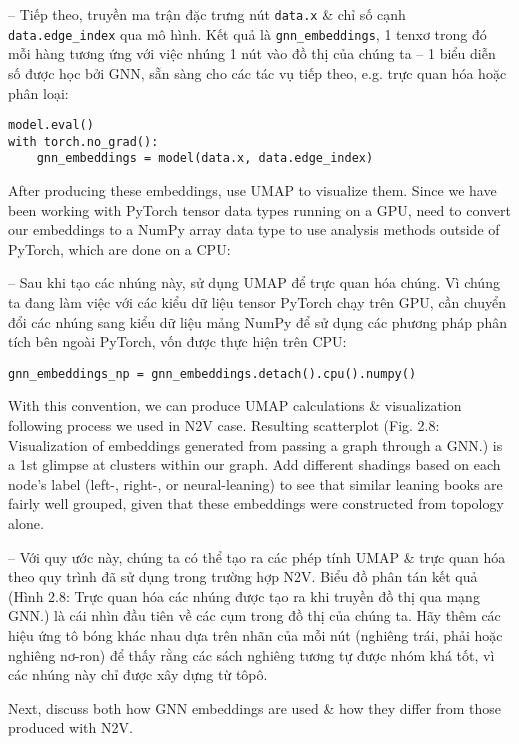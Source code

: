 \documentclass{article}
\begin{document}
\begin{itemize}
\begin{itemize}
\begin{itemize}
\begin{itemize}
               -- Tiếp theo, truyền ma trận đặc trưng nút {\tt data.x} \& chỉ số cạnh \verb|data.edge_index| qua mô hình. Kết quả là \verb|gnn_embeddings|, 1 tenxơ trong đó mỗi hàng tương ứng với việc nhúng 1 nút vào đồ thị của chúng ta -- 1 biểu diễn số được học bởi GNN, sẵn sàng cho các tác vụ tiếp theo, e.g. trực quan hóa hoặc phân loại:
               \begin{Verbatim}
model.eval()
with torch.no_grad():
    gnn_embeddings = model(data.x, data.edge_index)
               \end{Verbatim}
               After producing these embeddings, use UMAP to visualize them. Since we have been working with PyTorch tensor data types running on a GPU, need to convert our embeddings to a NumPy array data type to use analysis methods outside of PyTorch, which are done on a CPU:

               -- Sau khi tạo các nhúng này, sử dụng UMAP để trực quan hóa chúng. Vì chúng ta đang làm việc với các kiểu dữ liệu tensor PyTorch chạy trên GPU, cần chuyển đổi các nhúng sang kiểu dữ liệu mảng NumPy để sử dụng các phương pháp phân tích bên ngoài PyTorch, vốn được thực hiện trên CPU:
               \begin{verbatim}
gnn_embeddings_np = gnn_embeddings.detach().cpu().numpy()
               \end{verbatim}
               With this convention, we can produce UMAP calculations \& visualization following process we used in N2V case. Resulting scatterplot ({\sf Fig. 2.8: Visualization of embeddings generated from passing a graph through a GNN.}) is a 1st glimpse at clusters within our graph. Add different shadings based on each node's label (left-, right-, or neural-leaning) to see that similar leaning books are fairly well grouped, given that these embeddings were constructed from topology alone.

               -- Với quy ước này, chúng ta có thể tạo ra các phép tính UMAP \& trực quan hóa theo quy trình đã sử dụng trong trường hợp N2V. Biểu đồ phân tán kết quả ({\sf Hình 2.8: Trực quan hóa các nhúng được tạo ra khi truyền đồ thị qua mạng GNN.}) là cái nhìn đầu tiên về các cụm trong đồ thị của chúng ta. Hãy thêm các hiệu ứng tô bóng khác nhau dựa trên nhãn của mỗi nút (nghiêng trái, phải hoặc nghiêng nơ-ron) để thấy rằng các sách nghiêng tương tự được nhóm khá tốt, vì các nhúng này chỉ được xây dựng từ tôpô.

               Next, discuss both how GNN embeddings are used \& how they differ from those produced with N2V.


\end{itemize}
\end{itemize}
\end{itemize}
\end{itemize}
\end{document}
